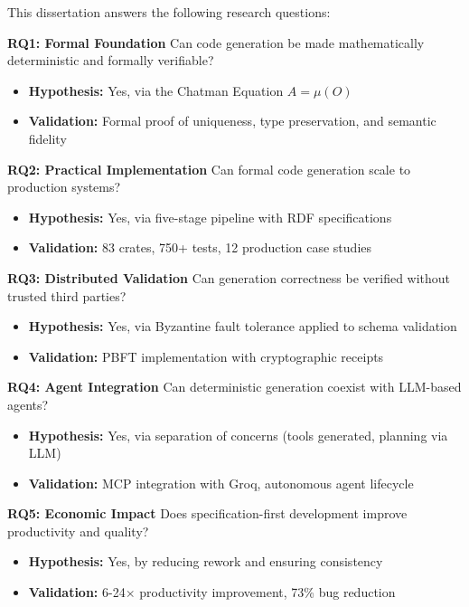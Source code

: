 This dissertation answers the following research questions:

\textbf{RQ1: Formal Foundation} Can code generation be made mathematically deterministic and formally verifiable?
\begin{itemize}
    \item \textbf{Hypothesis:} Yes, via the Chatman Equation \(A = \mu(O)\)
    \item \textbf{Validation:} Formal proof of uniqueness, type preservation, and semantic fidelity
\end{itemize}

\textbf{RQ2: Practical Implementation} Can formal code generation scale to production systems?
\begin{itemize}
    \item \textbf{Hypothesis:} Yes, via five-stage pipeline with RDF specifications
    \item \textbf{Validation:} 83 crates, 750+ tests, 12 production case studies
\end{itemize}

\textbf{RQ3: Distributed Validation} Can generation correctness be verified without trusted third parties?
\begin{itemize}
    \item \textbf{Hypothesis:} Yes, via Byzantine fault tolerance applied to schema validation
    \item \textbf{Validation:} PBFT implementation with cryptographic receipts
\end{itemize}

\textbf{RQ4: Agent Integration} Can deterministic generation coexist with LLM-based agents?
\begin{itemize}
    \item \textbf{Hypothesis:} Yes, via separation of concerns (tools generated, planning via LLM)
    \item \textbf{Validation:} MCP integration with Groq, autonomous agent lifecycle
\end{itemize}

\textbf{RQ5: Economic Impact} Does specification-first development improve productivity and quality?
\begin{itemize}
    \item \textbf{Hypothesis:} Yes, by reducing rework and ensuring consistency
    \item \textbf{Validation:} 6-24$\times$ productivity improvement, 73\% bug reduction
\end{itemize}


